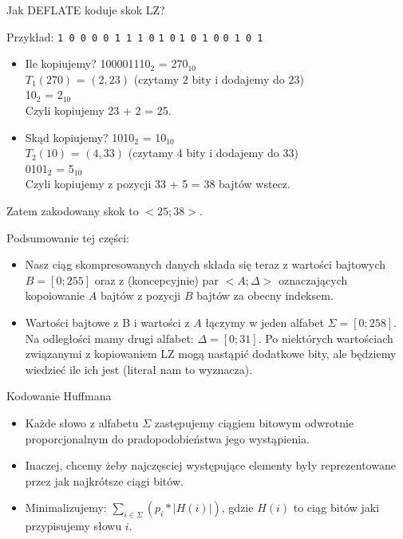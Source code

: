 \documentclass[presentation]{beamer}
\begin{document}
\begin{frame}[label={sec:org6c80802}]{Jak DEFLATE koduje skok LZ?}
\begin{block}{Przykład:}
{\color{black}\texttt{1 0 0 0 0 1 1 1 0}}
{\color{red}\texttt{1 0}}
{\color{black}\texttt{1 0 1 0}}
{\color{blue}\texttt{0 1 0 1}}

\begin{itemize}
\item Ile kopiujemy?
100001110\(_{\text{2}}\) = 270\(_{\text{10}}\) \\
\(T_{1}(270)\) = \((2, 23)\) (czytamy \(2\) bity i dodajemy do \(23\)) \\
{\color{red}10\(_{\text{2}}\)} = {\color{red}2\(_{\text{10}}\)} \\
Czyli kopiujemy 23 + {\color{red}2} = 25.

\item Skąd kopiujemy?
1010\(_{\text{2}}\) = 10\(_{\text{10}}\) \\
\(T_{2}(10)\) = \((4, 33)\) (czytamy \(4\) bity i dodajemy do \(33\)) \\
{\color{blue}0101\(_{\text{2}}\)} = {\color{blue}5\(_{\text{10}}\)} \\
Czyli kopiujemy z pozycji 33 + {\color{blue}5} = 38 bajtów wstecz.
\end{itemize}
\end{block}

\begin{block}{Zatem zakodowany skok to \(<25; 38>\).}
\end{block}
\end{frame}

\begin{frame}[label={sec:org1ad657d}]{Podsumowanie tej części:}
\begin{itemize}
\item Nasz ciąg skompresowanych danych składa się teraz z wartości bajtowych
\(B = [0; 255]\) oraz z (koncepcyjnie) par \(<A; \Delta>\) oznaczających
kopoiowanie \(A\) bajtów z pozycji \(B\) bajtów za obecny indeksem.
\item Wartości bajtowe z B i wartości z \(A\) łączymy w jeden alfabet \(\Sigma =
     [0;258]\). Na odległości mamy drugi alfabet: \(\Delta = [0; 31]\). Po
niektórych wartościach związanymi z kopiowaniem LZ mogą nastąpić dodatkowe
bity, ale będziemy wiedzieć ile ich jest (literał nam to wyznacza).
\end{itemize}
\end{frame}

\begin{frame}[label={sec:org9e52388}]{Kodowanie Huffmana}
\begin{itemize}
\item Każde słowo z alfabetu \(\Sigma\) zastępujemy ciągiem bitowym
odwrotnie proporcjonalnym do pradopodobieństwa jego wystąpienia.
\item Inaczej, chcemy żeby najczęsciej występujące elementy były
reprezentowane przez jak najkrótsze ciągi bitów.
\item Minimalizujemy: \(\sum_{i \in \Sigma} (p_{i} * |H(i)|)\), gdzie
\(H(i)\) to ciąg bitów jaki przypisujemy słowu \(i\).
\end{itemize}
\end{frame}
\end{document}
